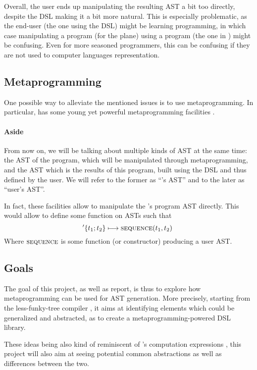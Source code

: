 Overall, the user ends up manipulating the resulting AST a bit too directly, despite the DSL making it a bit more natural.
This is especially problematic, as the end-user (the one using the DSL) might be learning programming, in which case 
manipulating a program (for the plane) using a program (the one in \Scala{}) might be confusing.
Even for more seasoned programmers, this can be confusing if they are not used to computer languages representation.

\subsection{Metaprogramming}
One possible way to alleviate the mentioned issues is to use metaprogramming.
In particular, \Scala{} has some young yet powerful metaprogramming facilities \cite{metaprogramming}.

\begin{tcolorbox}
\paragraph{Aside} 
From now on, we will be talking about multiple kinds of AST at the same time:
the AST of the \Scala{} program, which will be manipulated through metaprogramming,
and the AST which is the results of this program, built using the DSL and thus defined by the user.
We will refer to the former as ``\Scala{}'s AST'' and to the later as ``user's AST''.
\end{tcolorbox}

In fact, these facilities allow to manipulate the \Scala{}'s program AST directly.
This would allow to define some function on ASTs such that
\[ '\{  t_1; t_2 \} \longmapsto \textsc{sequence}(t_1, t_2) \ \]
Where $\textsc{sequence}$ is some function (or constructor) producing a user AST.

\subsection{Goals}
The goal of this project, as well as report, is thus to explore how metaprogramming can be used for AST generation.
More precisely, starting from the less-funky-tree compiler \cite{less-funky-trees},
it aims at identifying elements which could be generalized and abstracted,
as to create a metaprogramming-powered DSL library.

These ideas being also kind of reminiscent of \Fsharp{}'s computation expressions \cite{ceZoo},
this project will also aim at seeing potential common abstractions as well as differences between the two.

